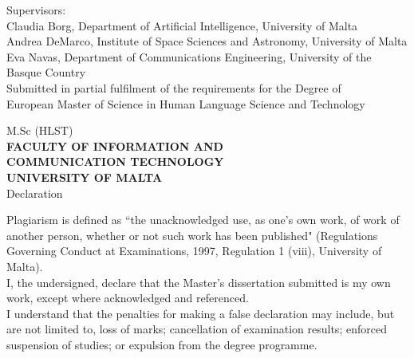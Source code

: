 \documentclass
[
    a4paper,
    twoside,
    12pt,
]
{report}
\begin{document}
\begin{titlepage}
\begin{center}
       \vspace*{2.0cm}
	   Supervisors: \\
       Claudia Borg, Department of Artificial Intelligence, University of Malta \\
       Andrea DeMarco, Institute of Space Sciences and Astronomy, University of Malta \\
       Eva Navas, Department of Communications Engineering, University of the Basque Country \\
       
       \vspace*{4.0cm}
       Submitted in partial fulfilment of the requirements for the Degree of \\
       European Master of Science in Human Language Science and Technology
    \end{center}



\end{titlepage}

\onehalfspacing
{}

\cleardoublepage

\begin{center}
  M.Sc (HLST) \\
  \uppercase{\textbf{Faculty of Information and \\
  Communication Technology \\ University of Malta \\ }}
  \vspace*{0.5cm}
  Declaration \\
\end{center}
  \vspace*{1.5cm}
        Plagiarism is defined as ``the unacknowledged use, as one's own work, of work of another person, whether or not such work has been published" (Regulations Governing Conduct at Examinations, 1997, Regulation 1 (viii), University of Malta). \\

I, the undersigned, declare that the Master's dissertation submitted is my own work, except where acknowledged and referenced. \\

I understand that the penalties for making a false declaration may include, but are not limited to, loss of marks; cancellation of examination results; enforced suspension of studies; or expulsion from the degree programme. \\
       
\end{document}
